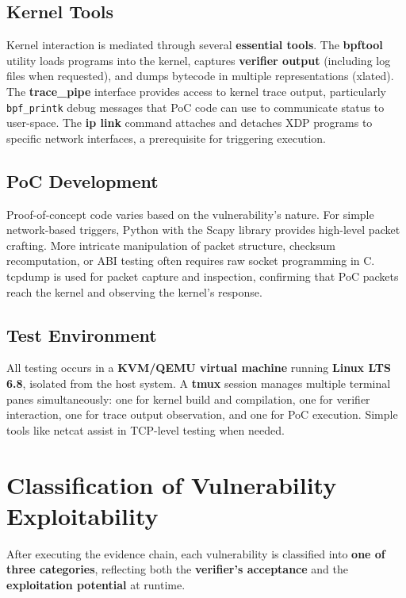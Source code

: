 \subsection{Kernel Tools}

Kernel interaction is mediated through several \textbf{essential tools}. The \textbf{bpftool} utility loads programs into the kernel, captures \textbf{verifier output} (including log files when requested), and dumps bytecode in multiple representations (xlated). The \textbf{trace\_pipe} interface provides access to kernel trace output, particularly \texttt{bpf\_printk} debug messages that PoC code can use to communicate status to user-space. The \textbf{ip link} command attaches and detaches XDP programs to specific network interfaces, a prerequisite for triggering execution.

\subsection{PoC Development}

Proof-of-concept code varies based on the vulnerability's nature. For simple network-based triggers, Python with the Scapy library provides high-level packet crafting. More intricate manipulation of packet structure, checksum recomputation, or ABI testing often requires raw socket programming in C. tcpdump is used for packet capture and inspection, confirming that PoC packets reach the kernel and observing the kernel's response.

\subsection{Test Environment}

All testing occurs in a \textbf{KVM/QEMU virtual machine} running \textbf{Linux LTS 6.8}, isolated from the host system. A \textbf{tmux} session manages multiple terminal panes simultaneously: one for kernel build and compilation, one for verifier interaction, one for trace output observation, and one for PoC execution. Simple tools like netcat assist in TCP-level testing when needed.

\section{Classification of Vulnerability Exploitability}

After executing the evidence chain, each vulnerability is classified into \textbf{one of three categories}, reflecting both the \textbf{verifier's acceptance} and the \textbf{exploitation potential} at runtime.

